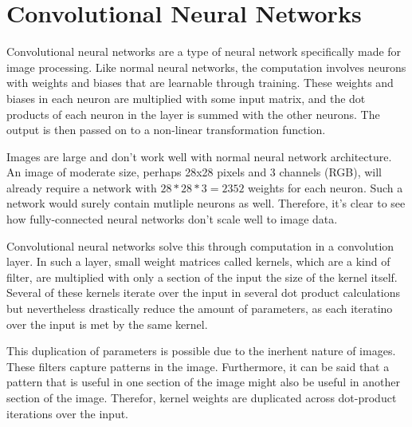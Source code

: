 \documentclass[12pt]{article}
\begin{document}
\section{Convolutional Neural Networks}
Convolutional neural networks are a type of neural network specifically made for image processing. Like normal neural networks, the computation involves neurons with weights and biases that are learnable through training. These weights and biases in each neuron are multiplied with some input matrix, and the dot products of each neuron in the layer is summed with the other neurons. The output is then passed on to a non-linear transformation function.

Images are large and don't work well with normal neural network architecture. An image of moderate size, perhaps 28x28 pixels and 3 channels (RGB), will already require a network with \begin{math}28*28*3 = 2352\end{math} weights for each neuron. Such a network would surely contain mutliple neurons as well. Therefore, it's clear to see how fully-connected neural networks don't scale well to image data. 

Convolutional neural networks solve this through computation in a convolution layer. In such a layer, small weight matrices called kernels, which are a kind of filter, are multiplied with only a section of the input the size of the kernel itself. Several of these kernels iterate over the input in several dot product calculations but nevertheless drastically reduce the amount of parameters, as each iteratino over the input is met by the same kernel.

This duplication of parameters is possible due to the inerhent nature of images. These filters capture patterns in the image. Furthermore, it can be said that a pattern that is useful in one section of the image might also be useful in another section of the image. Therefor, kernel weights are duplicated across dot-product iterations over the input.









\begin{thebibliography}{10}
\end{thebibliography}
\end{document}
